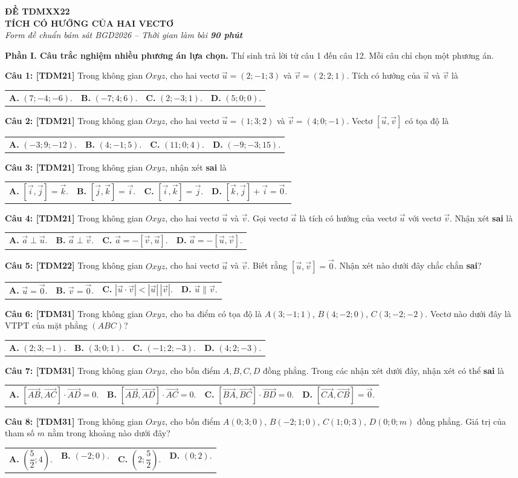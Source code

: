 \documentclass[12pt,a4paper]{article}
\makeatletter
\newcommand{\question}[2][TDM31]{%
  \par\noindent\textbf{\textcolor{sectionpurple}{Câu #2:} \textcolor{noteborder}{[#1]}}\enspace}
\newcommand{\answerlabel}[1]{\textbf{\textcolor{sectionpurple}{#1.}}}
\newcommand{\fourchoices}[4]{%
 \par\nobreak\vspace{1pt}\begin{tabular*}{\linewidth}{@{}l@{\extracolsep{\fill}}lll@{}}
 \answerlabel{A} #1 & \answerlabel{B} #2 & \answerlabel{C} #3 & \answerlabel{D} #4
 \end{tabular*}\par}
\newcommand{\examtitle}[2]{%
 \par\begin{center}\textbf{ĐỀ #1}\\[-1pt]\textbf{#2}\\[-1pt]
 {\fontsize{10.5}{12}\selectfont\itshape Form đề chuẩn bám sát BGD2026 -- Thời gian làm bài \textbf{90 phút}}\end{center}\vspace{-7pt}}
\newcommand{\partone}[1]{\par\textbf{Phần I. Câu trắc nghiệm nhiều phương án lựa chọn.} Thí sinh trả lời từ câu 1 đến câu #1. Mỗi câu chỉ chọn một phương án.\par}
\makeatother
\begin{document}
\fontsize{11.5}{14}\selectfont
\examtitle{TDMXX22}{TÍCH CÓ HƯỚNG CỦA HAI VECTƠ}
\partone{12}

\question[TDM21]{1} Trong không gian $Oxyz$, cho hai vectơ $\vec{u}=(2;-1;3)$ và $\vec{v}=(2;2;1)$. Tích có hướng của $\vec{u}$ và $\vec{v}$ là
\fourchoices{$(7;-4;-6)$.}{$(-7;4;6)$.}{$(2;-3;1)$.}{$(5;0;0)$.}

\question[TDM21]{2} Trong không gian $Oxyz$, cho hai vectơ $\vec{u}=(1;3;2)$ và $\vec{v}=(4;0;-1)$. Vectơ $[\vec{u},\vec{v}]$ có tọa độ là
\fourchoices{$(-3;9;-12)$.}{$(4;-1;5)$.}{$(11;0;4)$.}{$(-9;-3;15)$.}

\question[TDM21]{3} Trong không gian $Oxyz$, nhận xét \textbf{sai} là
\fourchoices{$[\vec{i},\vec{j}]=\vec{k}$.}{$[\vec{j},\vec{k}]=\vec{i}$.}{$[\vec{i},\vec{k}]=\vec{j}$.}{$[\vec{k},\vec{j}]+\vec{i}=\vec{0}$.}

\question[TDM21]{4} Trong không gian $Oxyz$, cho hai vectơ $\vec{u}$ và $\vec{v}$. Gọi vectơ $\vec{a}$ là tích có hướng của vectơ $\vec{u}$ với vectơ $\vec{v}$. Nhận xét \textbf{sai} là
\fourchoices{$\vec{a}\perp\vec{u}$.}{$\vec{a}\perp\vec{v}$.}{$\vec{a}=-[\vec{v},\vec{u}]$.}{$\vec{a}=-[\vec{u},\vec{v}]$.}

\question[TDM22]{5} Trong không gian $Oxyz$, cho hai vectơ $\vec{u}$ và $\vec{v}$. Biết rằng $[\vec{u},\vec{v}]=\vec{0}$. Nhận xét nào dưới đây chắc chắn \textbf{sai}?
\fourchoices{$\vec{u}=\vec{0}$.}{$\vec{v}=\vec{0}$.}{$|\vec{u}\cdot\vec{v}|<|\vec{u}|\,|\vec{v}|$.}{$\vec{u}\parallel\vec{v}$.}

\question[TDM31]{6} Trong không gian $Oxyz$, cho ba điểm có tọa độ là $A(3;-1;1)$, $B(4;-2;0)$, $C(3;-2;-2)$. Vectơ nào dưới đây là VTPT của mặt phẳng $(ABC)$?
\fourchoices{$(2;3;-1)$.}{$(3;0;1)$.}{$(-1;2;-3)$.}{$(4;2;-3)$.}

\question[TDM31]{7} Trong không gian $Oxyz$, cho bốn điểm $A,B,C,D$ đồng phẳng. Trong các nhận xét dưới đây, nhận xét có thể \textbf{sai} là
\fourchoices{$[\overrightarrow{AB},\overrightarrow{AC}]\cdot\overrightarrow{AD}=0$.}{$[\overrightarrow{AB},\overrightarrow{AD}]\cdot\overrightarrow{AC}=0$.}{$[\overrightarrow{BA},\overrightarrow{BC}]\cdot\overrightarrow{BD}=0$.}{$[\overrightarrow{CA},\overrightarrow{CB}]=\vec{0}$.}

\question[TDM31]{8} Trong không gian $Oxyz$, cho bốn điểm $A(0;3;0)$, $B(-2;1;0)$, $C(1;0;3)$, $D(0;0;m)$ đồng phẳng. Giá trị của tham số $m$ nằm trong khoảng nào dưới đây?
\fourchoices{$\left(\dfrac52;4\right)$.}{$(-2;0)$.}{$\left(2;\dfrac52\right)$.}{$(0;2)$.}
\end{document}
